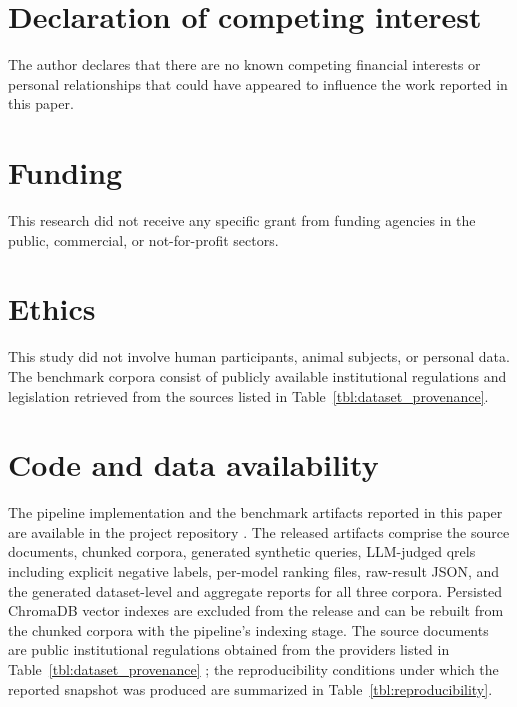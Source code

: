 \printcredits

\section*{Declaration of competing interest}

The author declares that there are no known competing financial interests or personal
relationships that could have appeared to influence the work reported in this paper.

\section*{Funding}

This research did not receive any specific grant from funding agencies in the public,
commercial, or not-for-profit sectors.

\section*{Ethics}

This study did not involve human participants, animal subjects, or personal data. The
benchmark corpora consist of publicly available institutional regulations and legislation
retrieved from the sources listed in Table~\ref{tbl:dataset_provenance}.

\section*{Code and data availability}

The pipeline implementation and the benchmark artifacts reported in this paper are available
in the project repository \citep{GitHub_RagRetrievalBench}. The released artifacts comprise
the source documents, chunked corpora, generated synthetic queries, LLM-judged qrels
including explicit negative labels, per-model ranking files, raw-result JSON, and the
generated dataset-level and aggregate reports for all three corpora. Persisted ChromaDB
vector indexes are excluded from the release and can be rebuilt from the chunked corpora with
the pipeline's indexing stage. The source documents are public institutional regulations
obtained from the providers listed in Table~\ref{tbl:dataset_provenance}
\citep{TED_Regulations, BDDK_Mevzuat}; the reproducibility conditions under which the reported
snapshot was produced are summarized in Table~\ref{tbl:reproducibility}.
